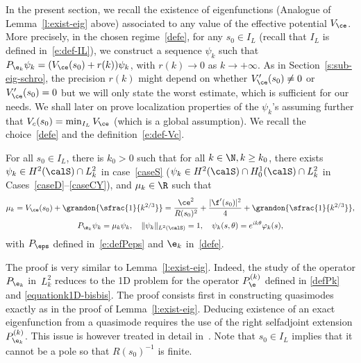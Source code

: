 In the present section, we recall the existence of eigenfunctions (Analogue of Lemma~\ref{l:exist-eig} above) associated to any value of the effective potential $V_\ce$. More precisely, in the chosen regime~\eqref{defe}, for any $s_0\in I_L$ (recall that $I_L$ is defined in~\eqref{e:def-IL}), we construct a sequence $\psi_k$ such that $P_{\e_k} \psi_k = (V_\ce(s_0) + r(k)) \psi_k$, with $r(k)\to 0$ as $k\to + \infty$. As in Section~\ref{s:sub-eig-schro}, the precision $r(k)$ might depend on whether $V_\ce'(s_0) \neq 0$ or $V_\ce'(s_0) = 0$ but we will only state the worst estimate, which is sufficient for our needs. We shall later on prove localization properties of the $\psi_k$'s assuming further that $V_c(s_0) = \min_{I_L}V_\ce$ (which is a global assumption).
We recall the choice~\eqref{defe} and the definition~\eqref{e:def-Vc}.

\begin{lemma}
\label{l:exist-mu-psibord}
For all $s_0 \in I_L$, there is $k_0>0$ such that for all $k\in\N, k\geq k_0$, there exists $\psi_k \in H^{2}(\calS)\cap L^2_k$ in case~\ref{caseS} (\resp $\psi_k \in H^{2}(\calS)\cap H^1_0(\calS)\cap L^2_k$ in Cases~\ref{caseD}--\ref{caseCY}), and $\mu_k \in \R$ such that
\begin{gather*}
\mu_k= V_\ce(s_0) +\grandon{\sfrac{1}{k^{2/3}}}
= \frac{\ce^2}{R(s_0)^2}+\frac{|\f'(s_0)|^2}{4} + \grandon{\sfrac{1}{k^{2/3}}}, \\
P_{\e_k} \psi_k = \mu_k \psi_k, \quad \|\psi_k\|_{L^2(\calS)}=1, \quad \psi_k(s,\theta) = e^{ik\theta} \varphi_k(s),
\end{gather*}
with $P_\eps$ defined in~\eqref{e:defPeps} and $\e_k$ in~\eqref{defe}.
\end{lemma}
The proof is very similar to Lemma~\ref{l:exist-eig}. Indeed, the study of the operator $P_{\e_k}$ in~$L^{2}_{k}$ reduces to the 1D problem for the operator $P_{\e}^{(k)}$ defined in \eqref{defPk} and \eqref{equationk1D-bisbis}. The proof consists first in constructing quasimodes exactly as in the proof of Lemma~\ref{l:exist-eig}. Deducing existence of an exact eigenfunction from a quasimode requires the use of the right selfadjoint extension $P_{\e_{k}}^{(k)}$. This issue is however treated in detail in~\cite[Lem.\,3.6]{LL:18}.
Note that $s_{0} \in I_L$ implies that it cannot be a pole so that $R(s_{0})^{-1}$ is finite.

